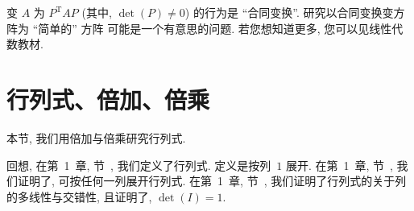 \documentclass[../libro.tex]{subfiles}
\begin{document}





变 \(A\) 为 \(P^{\mathrm{T}} A P\)
(其中, \(\det {(P)} \neq 0\))
的行为是 ``合同变换''.
研究以合同变换变方阵为 ``简单的'' 方阵%
可能是一个有意思的问题.
若您想知道更多,
您可以见线性代数教材.

\section{行列式、倍加、倍乘}

本节, 我们用倍加与倍乘研究行列式.

回想, 在第~1~章, 节~, 我们定义了行列式.
定义是按列~\(1\) 展开.
在第~1~章, 节~, 我们证明了,
可按任何一列展开行列式.
在第~1~章, 节~,
我们证明了行列式的关于列的多线性与交错性,
且证明了, \(\det {(I)} = 1\).
\end{document}
